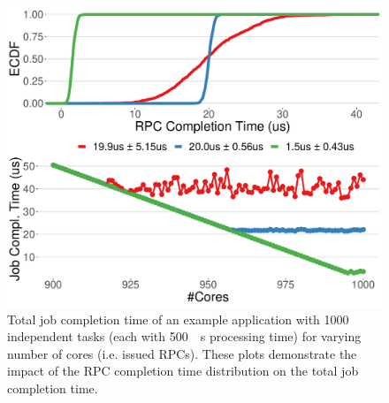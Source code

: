 \begin{figure}
  \includegraphics[width=0.9\linewidth]{./figures/nano-comptime}
  \caption{Total job completion time of an example application with 1000 independent tasks (each with \SI{500}{\mu s} processing time) for varying number of cores (i.e. issued RPCs). These plots demonstrate the impact of the RPC completion time distribution on the total job completion time.}
  \label{fig:nanoservice-sim}
\end{figure}


